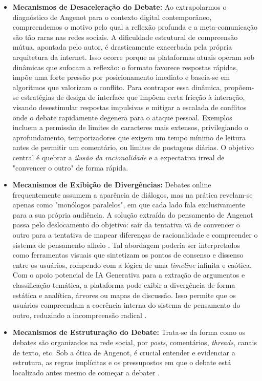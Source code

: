 \documentclass[conference]{IEEEtran} \IEEEoverridecommandlockouts %
\begin{document}
\begin{itemize}
    \item \textbf{Mecanismos de Desaceleração do Debate:}  Ao extrapolarmos o diagnóstico de Angenot \cite{angenot2008dialogues} para o contexto digital contemporâneo, compreendemos o motivo pelo qual a reflexão profunda e a meta-comunicação são tão raras nas redes sociais. A dificuldade estrutural de compreensão mútua, apontada pelo autor, é drasticamente exacerbada pela própria arquitetura da internet. Isso ocorre porque as plataformas atuais operam sob dinâmicas que sufocam a reflexão: o formato favorece respostas rápidas, impõe uma forte pressão por posicionamento imediato e baseia-se em algoritmos que valorizam o conflito. Para contrapor essa dinâmica, propõem-se estratégias de design de interface que impõem certa fricção à interação, visando desestimular respostas impulsivas e mitigar a escalada de conflitos onde o debate rapidamente degenera para o ataque pessoal. Exemplos incluem a permissão de limites de caracteres mais extensos, privilegiando o aprofundamento, temporizadores que exigem um tempo mínimo de leitura antes de permitir um comentário, ou limites de postagens diárias. O objetivo central é quebrar a \textit{ilusão da racionalidade} e a expectativa irreal de "convencer o outro" de forma rápida.


    \item \textbf{Mecanismos de Exibição de Divergências:} Debates online frequentemente assumem a aparência de diálogos, mas na prática revelam-se apenas como "monólogos paralelos", em que cada lado fala exclusivamente para a sua própria audiência. A solução extraída do pensamento de Angenot passa pelo deslocamento do objetivo: sair da tentativa vã de convencer o outro para a tentativa de mapear diferenças de racionalidade e compreender o sistema de pensamento alheio \cite{angenot2008dialogues}. Tal abordagem poderia ser interpretados como ferramentas visuais que sintetizam os pontos de consenso e dissenso entre os usuários, rompendo com a lógica de uma \textit{timeline} infinita e caótica. Com o apoio potencial de IA Generativa para a extração de argumentos e classificação temática, a plataforma pode exibir a divergência de forma estática e analítica, árvores ou mapas de discussão. Isso permite que os usuários compreendam a coerência interna do sistema de pensamento do outro, reduzindo a incompreensão radical \cite{angenot2008dialogues}.


    \item \textbf{Mecanismos de Estruturação do Debate:} Trata-se da forma como os debates são organizados na rede social, por \textit{posts}, comentários, \textit{threads}, canais de texto, etc. Sob a ótica de Angenot, é crucial entender e evidenciar a estrutura, as regras implícitas e os pressupostos em que o debate está localizado antes mesmo de começar a debater \cite{angenot2008dialogues}.


\end{itemize}
\end{document}
